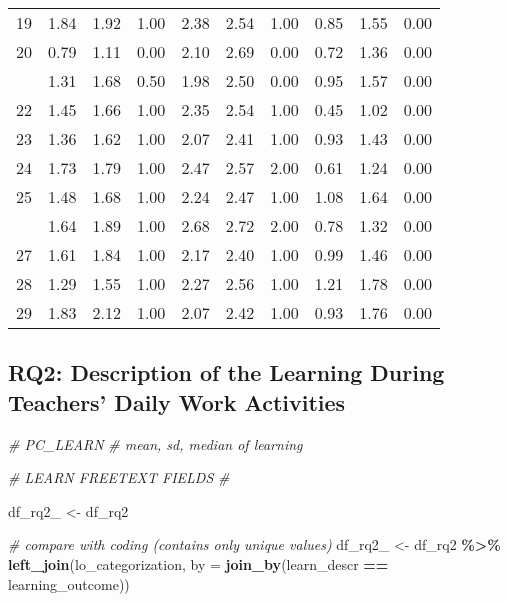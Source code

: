 \documentclass[
]{article}
\newenvironment{Shaded}{\begin{snugshade}}{\end{snugshade}}
\newcommand{\AttributeTok}[1]{\textcolor[rgb]{0.13,0.29,0.53}{#1}}
\newcommand{\CommentTok}[1]{\textcolor[rgb]{0.56,0.35,0.01}{\textit{#1}}}
\newcommand{\FunctionTok}[1]{\textcolor[rgb]{0.13,0.29,0.53}{\textbf{#1}}}
\newcommand{\NormalTok}[1]{#1}
\newcommand{\OtherTok}[1]{\textcolor[rgb]{0.56,0.35,0.01}{#1}}
\newcommand{\SpecialCharTok}[1]{\textcolor[rgb]{0.81,0.36,0.00}{\textbf{#1}}}
\begin{document}
\begin{longtable}[t]{lccccccccc}
19 & 1.84 & 1.92 & 1.00 & 2.38 & 2.54 & 1.00 & 0.85 & 1.55 & 0.00\\
20 & 0.79 & 1.11 & 0.00 & 2.10 & 2.69 & 0.00 & 0.72 & 1.36 & 0.00\\
\addlinespace
21 & 1.31 & 1.68 & 0.50 & 1.98 & 2.50 & 0.00 & 0.95 & 1.57 & 0.00\\
22 & 1.45 & 1.66 & 1.00 & 2.35 & 2.54 & 1.00 & 0.45 & 1.02 & 0.00\\
23 & 1.36 & 1.62 & 1.00 & 2.07 & 2.41 & 1.00 & 0.93 & 1.43 & 0.00\\
24 & 1.73 & 1.79 & 1.00 & 2.47 & 2.57 & 2.00 & 0.61 & 1.24 & 0.00\\
25 & 1.48 & 1.68 & 1.00 & 2.24 & 2.47 & 1.00 & 1.08 & 1.64 & 0.00\\
\addlinespace
26 & 1.64 & 1.89 & 1.00 & 2.68 & 2.72 & 2.00 & 0.78 & 1.32 & 0.00\\
27 & 1.61 & 1.84 & 1.00 & 2.17 & 2.40 & 1.00 & 0.99 & 1.46 & 0.00\\
28 & 1.29 & 1.55 & 1.00 & 2.27 & 2.56 & 1.00 & 1.21 & 1.78 & 0.00\\
29 & 1.83 & 2.12 & 1.00 & 2.07 & 2.42 & 1.00 & 0.93 & 1.76 & 0.00\\
\bottomrule
\end{longtable}
\endgroup{}

\subsection{RQ2: Description of the Learning During Teachers' Daily Work
Activities}\label{rq2-description-of-the-learning-during-teachers-daily-work-activities}

\begin{Shaded}
\begin{Highlighting}[]
\CommentTok{\# PC\_LEARN}
\CommentTok{\# mean, sd, median of learning }

\CommentTok{\# LEARN FREETEXT FIELDS}
\CommentTok{\#}
\end{Highlighting}
\end{Shaded}

\begin{Shaded}
\begin{Highlighting}[]
\NormalTok{df\_rq2\_ }\OtherTok{\textless{}{-}}\NormalTok{ df\_rq2}

\CommentTok{\# compare with coding (contains only unique values)}
\NormalTok{df\_rq2\_ }\OtherTok{\textless{}{-}}\NormalTok{ df\_rq2 }\SpecialCharTok{\%\textgreater{}\%}
  \FunctionTok{left\_join}\NormalTok{(lo\_categorization, }\AttributeTok{by =} \FunctionTok{join\_by}\NormalTok{(learn\_descr }\SpecialCharTok{==}\NormalTok{ learning\_outcome))}
\end{Highlighting}
\end{Shaded}
\end{document}
